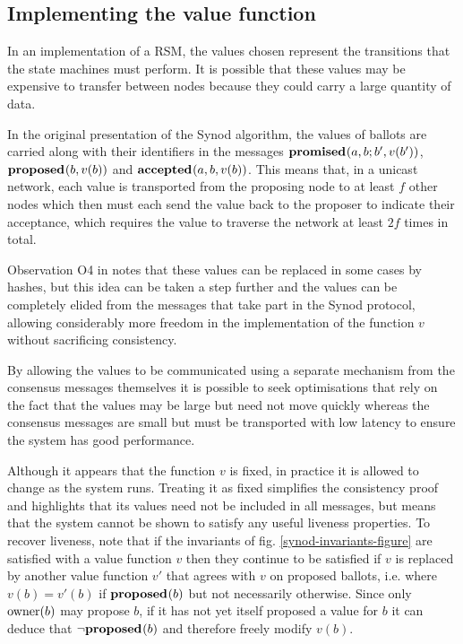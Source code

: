 \documentclass[journal]{IEEEtran}
\begin{document}
\subsection{Implementing the value function}\label{value-function}

In an implementation of a RSM, the values chosen represent the transitions that
the state machines must perform. It is possible that these values may be
expensive to transfer between nodes because they could carry a large quantity
of data.

In the original presentation of the Synod algorithm, the values of ballots are
carried along with their identifiers in the messages $\mathbf{promised}_{}(a,b; b',v(b')
)$, $\mathbf{proposed}_{}( b,v(b))$ and $\mathbf{accepted}_{}(a, b,v(b) )$. This means that, in a unicast
network, each value is transported from the proposing node to at least $f$
other nodes which then must each send the value back to the proposer to
indicate their acceptance, which requires the value to traverse the network at
least $2f$ times in total.

Observation O4 in \cite{cheap-paxos} notes that these values can be replaced in
some cases by hashes, but this idea can be taken a step further and the values
can be completely elided from the messages that take part in the Synod
protocol, allowing considerably more freedom in the implementation of the
function $v$ without sacrificing consistency.

By allowing the values to be communicated using a separate mechanism from the
consensus messages themselves it is possible to seek optimisations that rely on
the fact that the values may be large but need not move quickly whereas the
consensus messages are small but must be transported with low latency to ensure
the system has good performance.

Although it appears that the function $v$ is fixed, in practice it is allowed
to change as the system runs. Treating it as fixed simplifies the consistency
proof and highlights that its values need not be included in all messages, but
means that the system cannot be shown to satisfy any useful liveness
properties.  To recover liveness, note that if the invariants of fig.
\ref{synod-invariants-figure} are satisfied with a value function $v$ then they
continue to be satisfied if $v$ is replaced by another value function $v'$ that
agrees with $v$ on proposed ballots, i.e. where $v(b) = v'(b)$ if $\mathbf{proposed}_{}(b)$
but not necessarily otherwise. Since only $\mathrm{owner}(b)$ may propose $b$, if it
has not yet itself proposed a value for $b$ it can deduce that $\neg\mathbf{proposed}_{}(b)$
and therefore freely modify $v(b)$.
\end{document}
